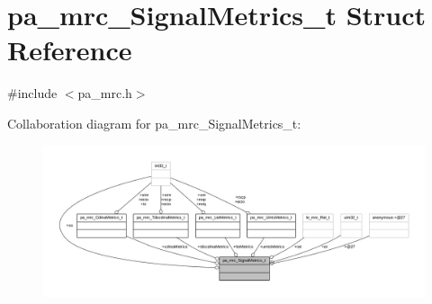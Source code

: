 \hypertarget{structpa__mrc___signal_metrics__t}{}\section{pa\+\_\+mrc\+\_\+\+Signal\+Metrics\+\_\+t Struct Reference}
\label{structpa__mrc___signal_metrics__t}


{\ttfamily \#include $<$pa\+\_\+mrc.\+h$>$}



Collaboration diagram for pa\+\_\+mrc\+\_\+\+Signal\+Metrics\+\_\+t\+:
\nopagebreak
\begin{figure}[H]
\begin{center}
\leavevmode
\includegraphics[width=350pt]{structpa__mrc___signal_metrics__t__coll__graph}
\end{center}
\end{figure}
